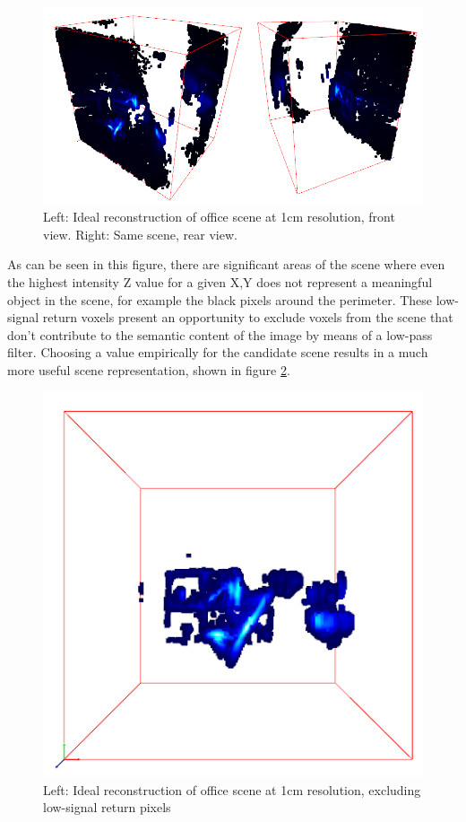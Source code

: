 \documentclass[conference]{IEEEtran}
\begin{document}
\begin{figure}
    \centering
        \includegraphics[width=0.8\columnwidth]{figures/3dscene.png}
    \caption{Left: Ideal reconstruction of office scene at 1cm resolution, front view. Right: Same scene, rear view.}
    \label{fig:3dscene}
\end{figure}

As can be seen in this figure, there are significant areas of the scene where even the highest intensity Z value for a given X,Y does not represent a meaningful object in the scene, for example the black pixels around the perimeter. These low-signal return voxels present an opportunity to exclude voxels from the scene that don't contribute to the semantic content of the image by means of a low-pass filter. Choosing a value empirically for the candidate scene results in a much more useful scene representation, shown in figure \ref{fig:threshold}.

\begin{figure}
    \centering
        \includegraphics[width=0.6\columnwidth]{figures/threshold.png}
    \caption{Left: Ideal reconstruction of office scene at 1cm resolution, excluding low-signal return pixels}
    \label{fig:threshold}
\end{figure}
\end{document}
